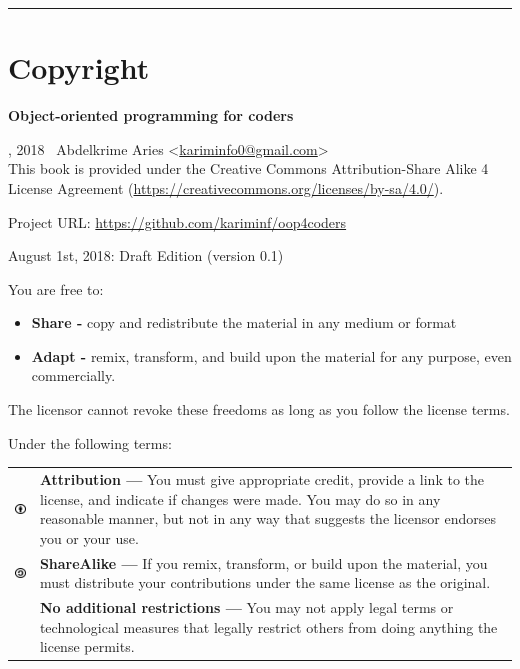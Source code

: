\documentclass[12pt]{book}
\begin{document}
\fi

\newpage
\hrule
\chapter*{Copyright}
\begin{flushright}
{\Huge \textbf{Object-oriented programming for coders}}
\end{flushright}

, 2018  \textcopyright\ Abdelkrime Aries <\href{mailto://kariminfo0@gmail.com}{kariminfo0@gmail.com}> \\[0.5cm]
This book is provided under the Creative Commons Attribution-Share Alike 4 License Agreement (\url{https://creativecommons.org/licenses/by-sa/4.0/}).

\vspace{0.5cm}
\noindent
Project URL: \url{https://github.com/kariminf/oop4coders}

\vspace{1cm}
\noindent
August 1st, 2018: \hspace{2cm} Draft Edition (version 0.1)

\scriptsize %
\vspace{1cm}
\noindent
You are free to:
\begin{itemize}
\item \textbf{Share -} copy and redistribute the material in any medium or format
\item \textbf{Adapt -} remix, transform, and build upon the material for any purpose, even commercially.
\end{itemize}
The licensor cannot revoke these freedoms as long as you follow the license terms.

\vspace{1cm}
\noindent
Under the following terms:\\
\begin{tabular}{m{}m{}}
%
\includegraphics[width=1cm]{img/by.png} & 
\textbf{Attribution —} You must give appropriate credit, provide a link to the license, and indicate if changes were made. You may do so in any reasonable manner, but not in any way that suggests the licensor endorses you or your use. \\
%
\includegraphics[width=1cm]{img/sa.png} &
\textbf{ShareAlike —} If you remix, transform, or build upon the material, you must distribute your contributions under the same license as the original.\\
%
&
\textbf{No additional restrictions —} You may not apply legal terms or technological measures that legally restrict others from doing anything the license permits.
%
\end{tabular}
\end{document}
